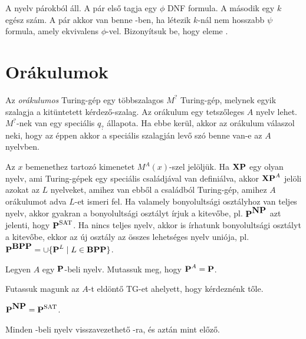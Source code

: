 \begin{Exercise}[counter={sorszam}, difficulty=0]
	A  nyelv párokból áll. A pár első tagja egy $\phi$ DNF formula. A második egy $k$ egész szám.
	A pár akkor van benne -ben, ha létezik $k$-nál nem hosszabb $\psi$ formula, amely ekvivalens $\phi$-vel.
	Bizonyítsuk be, hogy  eleme \Sigmatwo.
\end{Exercise}

\section{Or\'akulumok}

 Az {\em orákulumos} Turing-gép egy többszalagos $M^?$ Turing-gép, melynek egyik szalagja a kitüntetett kérdez\H o-szalag. Az orákulum egy tetsz\H oleges $A$ nyelv lehet. $M^?$-nek van egy speciális $q_?$ állapota. Ha ebbe kerül, akkor az orákulum válaszol neki, hogy az éppen akkor a speciális szalagján lev\H o szó benne van-e az $A$ nyelvben. 

Az $x$ bemenethez tartozó kimenetet $M^A(x)$-szel jelöljük. Ha $\XP$ egy olyan nyelv, ami Turing-gépek egy speci\'alis családj\'aval van defini\'alva, akkor $\XP^A$ jelöli azokat az $L$ nyelveket, amihez van ebb\H ol a csal\'adb\'ol Turing-g\'ep, amihez $A$ orákulumot adva $L$-et ismeri fel. Ha valamely bonyolults\'agi oszt\'alyhoz van teljes nyelv, akkor gyakran a bonyolults\'agi oszt\'alyt \'irjuk a kitev\H obe, pl. $\P^{\NP}$ azt jelenti, hogy $\P^{\SAT}$. Ha nincs teljes nyelv, akkor is \'irhatunk bonyolults\'agi oszt\'alyt a kitev\H obe, ekkor az \'uj oszt\'aly az \"osszes lehets\'eges nyelv uni\'oja, pl.\ $\P^{\BPP}=\cup \{\P^{L}\mid {L\in \BPP}\}$.

\begin{Exercise}[counter={sorszam}, difficulty=0]
	Legyen $A$ egy $\P$-beli nyelv. Mutassuk meg, hogy $\P^A=\P$.
\end{Exercise}	
\begin{Answer}
	Futassuk magunk az $A$-t eld\"ont\H o TG-et ahelyett, hogy k\'erdezn\'enk t\H ole.
\end{Answer}


\begin{Exercise}[counter={sorszam}, difficulty=0]
	$\P^{\NP}=\P^{\SAT}$.
\end{Exercise}	
\begin{Answer}
	Minden \NP-beli nyelv visszavezethet\H o \SAT-ra, \'es azt\'an mint el\H oz\H o.
\end{Answer}


